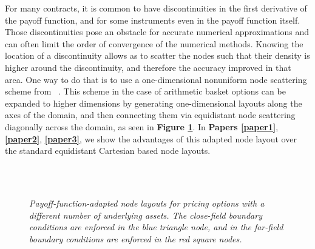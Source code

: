 \documentclass{UUThesisTemplate}
\begin{document}
\par
For many contracts, it is common to have discontinuities in the first derivative of the payoff function, and for some instruments even in the payoff function itself. Those discontinuities pose an obstacle for accurate numerical approximations and can often limit the order of convergence of the numerical methods. Knowing the location of a discontinuity allows as to scatter the nodes such that their density is higher around the discontinuity, and therefore the accuracy improved in that area. One way to do that is to use a one-dimensional nonuniform node scattering scheme from ~\cite{foulon2010adi}. This scheme in the case of arithmetic basket options can be expanded to higher dimensions by generating one-dimensional layouts along the axes of the domain, and then connecting them via equidistant node scattering diagonally across the domain, as seen in \textbf{Figure \ref{fig:gridadap}}. In \textbf{Papers \ref{paper1}}, \textbf{\ref{paper2}}, \textbf{\ref{paper3}}, we show the advantages of this adapted node layout over the standard equidistant Cartesian based node layouts.   

\begin{figure}[H]
\centering
\\
\vspace{11pt}
\\
\caption{\emph{Payoff-function-adapted node layouts for pricing options with a different number of underlying assets. The close-field boundary conditions are enforced in the blue triangle node, and in the far-field boundary conditions are enforced in the red square nodes.}}
\label{fig:gridadap}
\end{figure}
\end{document}
